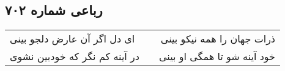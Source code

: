 \begin{center}
\section*{رباعی شماره ۷۰۲}
\label{sec:sh702}
\begin{longtable}{l p{0.5cm} r}
ای دل اگر آن عارض دلجو بینی
&&
ذرات جهان را همه نیکو بینی
\\
در آینه کم نگر که خودبین نشوی
&&
خود آینه شو تا همگی او بینی
\\
\end{longtable}
\end{center}
